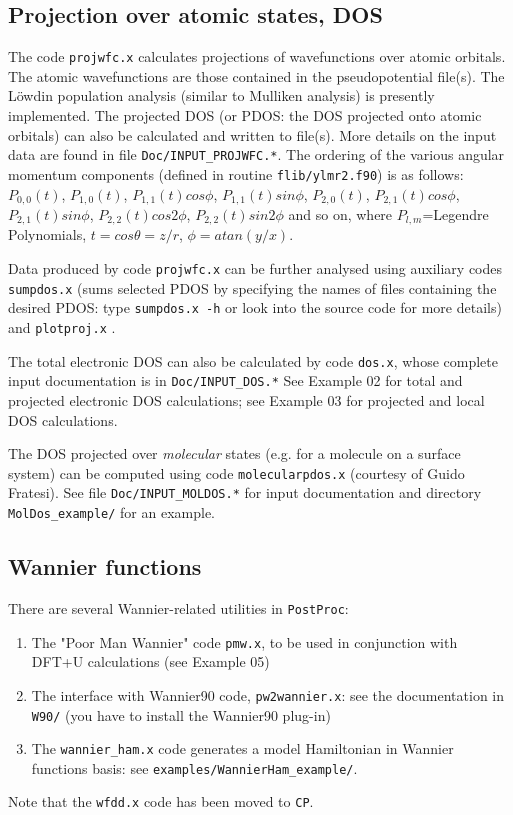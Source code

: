 \documentclass[12pt,a4paper]{article}
\def\CP{\texttt{CP}}
\def\PostProc{\texttt{PostProc}}
\begin{document}
\subsection{Projection over atomic states, DOS}

The code \texttt{projwfc.x} calculates projections of wavefunctions
over atomic orbitals. The atomic wavefunctions are those contained
in the pseudopotential file(s). The L\"owdin population analysis (similar to
Mulliken analysis) is presently implemented. The projected DOS (or PDOS:
the DOS projected onto atomic orbitals) can also be calculated and written
to file(s). More details on the input data are found in file
\texttt{Doc/INPUT\_PROJWFC.*}. The ordering of the various 
angular momentum components (defined in routine \texttt{flib/ylmr2.f90})
is as follows:
$P_{0,0}(t)$, $P_{1,0}(t)$, $P_{1,1}(t)cos\phi$, $P_{1,1}(t)sin\phi$,
 $P_{2,0}(t)$, $P_{2,1}(t)cos\phi$, $P_{2,1}(t)sin\phi$, 
 $P_{2,2}(t)cos2\phi$, $P_{2,2}(t)sin2\phi$
and so on, where $P_{l,m}$=Legendre Polynomials, 
$t = cos\theta = z/r$, $\phi= atan(y /x)$.

Data produced by code \texttt{projwfc.x} can be further 
analysed using auxiliary codes \texttt{sumpdos.x} (sums selected PDOS
by specifying the names of files containing the desired PDOS: type 
\texttt{sumpdos.x -h} or look into the source code for more details) 
and \texttt{plotproj.x} . 

The total electronic DOS can also be calculated by code \texttt{dos.x},
whose complete input documentation is in \texttt{Doc/INPUT\_DOS.*}
See Example 02 for total and projected electronic DOS calculations;
see Example 03 for projected and local DOS calculations.

The DOS projected over {\em molecular} states (e.g. for a molecule on
a surface system) can be computed using code \texttt{molecularpdos.x}
(courtesy of Guido Fratesi). See file \texttt{Doc/INPUT\_MOLDOS.*}
for input documentation and directory \texttt{MolDos\_example/} for
an example.

\subsection{Wannier functions}

There are several Wannier-related utilities in \PostProc:
\begin{enumerate}
\item The "Poor Man Wannier" code \texttt{pmw.x}, to be used
in conjunction with DFT+U calculations (see Example 05)
\item The interface with Wannier90 code, \texttt{pw2wannier.x}:
see the documentation in \texttt{W90/} (you have to install the 
Wannier90 plug-in)
\item The \texttt{wannier\_ham.x} code generates a model Hamiltonian 
in Wannier functions basis: see \texttt{examples/WannierHam\_example/}.
\end{enumerate}
Note that the \texttt{wfdd.x} code has been moved to \CP.
\end{document}
